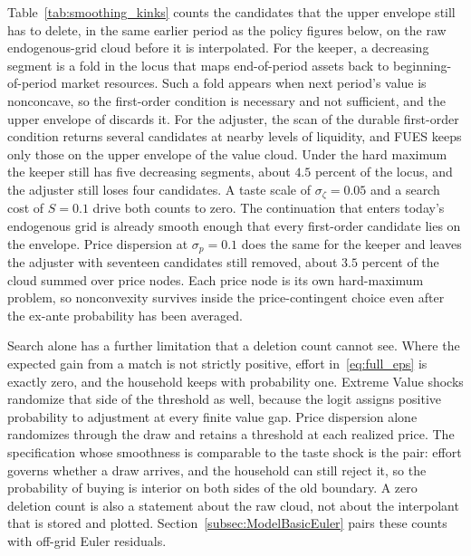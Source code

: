 Table~\ref{tab:smoothing_kinks} counts the candidates that the upper envelope still has to delete, in the same earlier period as the policy figures below, on the raw endogenous-grid cloud before it is interpolated. For the keeper, a decreasing segment is a fold in the locus that maps end-of-period assets back to beginning-of-period market resources. Such a fold appears when next period's value is nonconcave, so the first-order condition is necessary and not sufficient, and the upper envelope of \citet{Iskhakov2017-jb} discards it. For the adjuster, the scan of the durable first-order condition returns several candidates at nearby levels of liquidity, and FUES keeps only those on the upper envelope of the value cloud. Under the hard maximum the keeper still has five decreasing segments, about $4.5$ percent of the locus, and the adjuster still loses four candidates. A taste scale of $\sigma_\zeta = 0.05$ and a search cost of $S = 0.1$ drive both counts to zero. The continuation that enters today's endogenous grid is already smooth enough that every first-order candidate lies on the envelope. Price dispersion at $\sigma_p = 0.1$ does the same for the keeper and leaves the adjuster with seventeen candidates still removed, about $3.5$ percent of the cloud summed over price nodes. Each price node is its own hard-maximum problem, so nonconvexity survives inside the price-contingent choice even after the ex-ante probability has been averaged.

Search alone has a further limitation that a deletion count cannot see. Where the expected gain from a match is not strictly positive, effort in~\eqref{eq:full_eps} is exactly zero, and the household keeps with probability one. Extreme Value shocks randomize that side of the threshold as well, because the logit assigns positive probability to adjustment at every finite value gap. Price dispersion alone randomizes through the draw and retains a threshold at each realized price. The specification whose smoothness is comparable to the taste shock is the pair: effort governs whether a draw arrives, and the household can still reject it, so the probability of buying is interior on both sides of the old boundary. A zero deletion count is also a statement about the raw cloud, not about the interpolant that is stored and plotted. Section~\ref{subsec:ModelBasicEuler} pairs these counts with off-grid Euler residuals.


